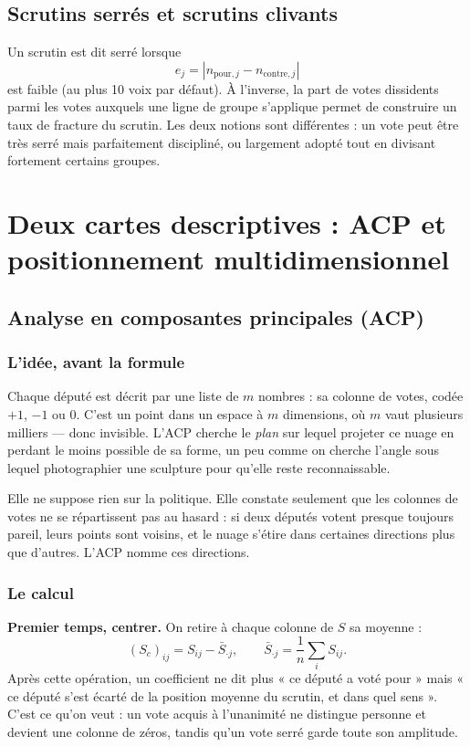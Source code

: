 \documentclass[11pt,a4paper]{article}
\begin{document}
\subsection{Scrutins serrés et scrutins clivants}

Un scrutin est dit serré lorsque
\[
 e_j=|n_{\mathrm{pour},j}-n_{\mathrm{contre},j}|
\]
est faible (au plus 10 voix par défaut). À l'inverse, la part de votes dissidents
parmi les votes auxquels une ligne de groupe s'applique permet de construire un
taux de fracture du scrutin. Les deux notions sont différentes : un vote peut
être très serré mais parfaitement discipliné, ou largement adopté tout en
divisant fortement certains groupes.

\section{Deux cartes descriptives : ACP et positionnement multidimensionnel}

\subsection{Analyse en composantes principales (ACP)}
\label{sec:acp}

\subsubsection*{L'idée, avant la formule}

Chaque député est décrit par une liste de $m$ nombres : sa colonne de votes,
codée $+1$, $-1$ ou $0$. C'est un point dans un espace à $m$ dimensions, où $m$
vaut plusieurs milliers — donc invisible. L'ACP cherche le \emph{plan} sur
lequel projeter ce nuage en perdant le moins possible de sa forme, un peu comme
on cherche l'angle sous lequel photographier une sculpture pour qu'elle reste
reconnaissable.

Elle ne suppose rien sur la politique. Elle constate seulement que les colonnes
de votes ne se répartissent pas au hasard : si deux députés votent presque
toujours pareil, leurs points sont voisins, et le nuage s'étire dans certaines
directions plus que d'autres. L'ACP nomme ces directions.

\subsubsection*{Le calcul}

\textbf{Premier temps, centrer.} On retire à chaque colonne de $S$ sa moyenne :
\[
 (S_c)_{ij}=S_{ij}-\bar S_{\cdot j},
 \qquad \bar S_{\cdot j}=\frac1n\sum_{i}S_{ij}.
\]
Après cette opération, un coefficient ne dit plus « ce député a voté pour »
mais « ce député s'est écarté de la position moyenne du scrutin, et dans quel
sens ». C'est ce qu'on veut : un vote acquis à l'unanimité ne distingue
personne et devient une colonne de zéros, tandis qu'un vote serré garde toute
son amplitude.
\end{document}
